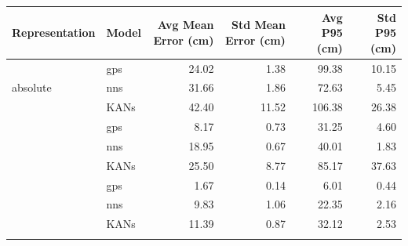 
\begin{tabular}{llrrrr}
\toprule
Representation & Model & Avg Mean Error (cm) & Std Mean Error (cm) & Avg P95 (cm) & Std P95 (cm) \\
\midrule

\multirow{3}{*}{absolute} & gps & 24.02 & 1.38 & 99.38 & 10.15 \\
 & nns & 31.66 & 1.86 & 72.63 & 5.45 \\
 & KANs & 42.40 & 11.52 & 106.38 & 26.38 \\
\addlinespace
\multirow{3}{*}{relative} & gps & 8.17 & 0.73 & 31.25 & 4.60 \\
 & nns & 18.95 & 0.67 & 40.01 & 1.83 \\
 & KANs & 25.50 & 8.77 & 85.17 & 37.63 \\
\addlinespace
\multirow{3}{*}{log_d} & gps & 1.67 & 0.14 & 6.01 & 0.44 \\
 & nns & 9.83 & 1.06 & 22.35 & 2.16 \\
 & KANs & 11.39 & 0.87 & 32.12 & 2.53 \\
\addlinespace

\bottomrule
\end{tabular}
